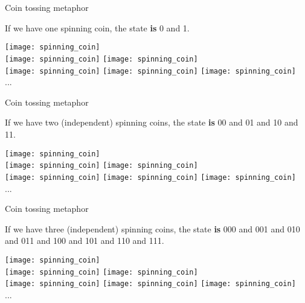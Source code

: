 \documentclass[aspectratio=43]{beamer}
\begin{document}
\begin{frame}{Coin tossing metaphor}
	\begin{cardTiny}
		If we have one spinning coin, the state \textbf{is} 0 and 1.
	\end{cardTiny}
    \begin{center}
        \texttt{[image: spinning\_coin]}\\
        \texttt{[image: spinning\_coin]}
        \texttt{[image: spinning\_coin]}\\
        \texttt{[image: spinning\_coin]}
        \texttt{[image: spinning\_coin]}
        \texttt{[image: spinning\_coin]}\\...
	\end{center}
\pagenumber
\end{frame}

\begin{frame}{Coin tossing metaphor}
	\begin{cardTiny}
		If we have two (independent) spinning coins, the state \textbf{is} 00 and 01 and 10 and 11.
	\end{cardTiny}
    \begin{center}
        \texttt{[image: spinning\_coin]}\\
        \texttt{[image: spinning\_coin]}
        \texttt{[image: spinning\_coin]}\\
        \texttt{[image: spinning\_coin]}
        \texttt{[image: spinning\_coin]}
        \texttt{[image: spinning\_coin]}\\...
	\end{center}
\pagenumber
\end{frame}

\begin{frame}{Coin tossing metaphor}
	\begin{cardTiny}
		If we have three (independent) spinning coins, the state \textbf{is} 000 and 001 and 010 and 011 and 100 and 101 and 110 and 111. 
	\end{cardTiny}
    \begin{center}
        \texttt{[image: spinning\_coin]}\\
        \texttt{[image: spinning\_coin]}
        \texttt{[image: spinning\_coin]}\\
        \texttt{[image: spinning\_coin]}
        \texttt{[image: spinning\_coin]}
        \texttt{[image: spinning\_coin]}\\...
	\end{center}
\pagenumber
\end{frame}
\end{document}
